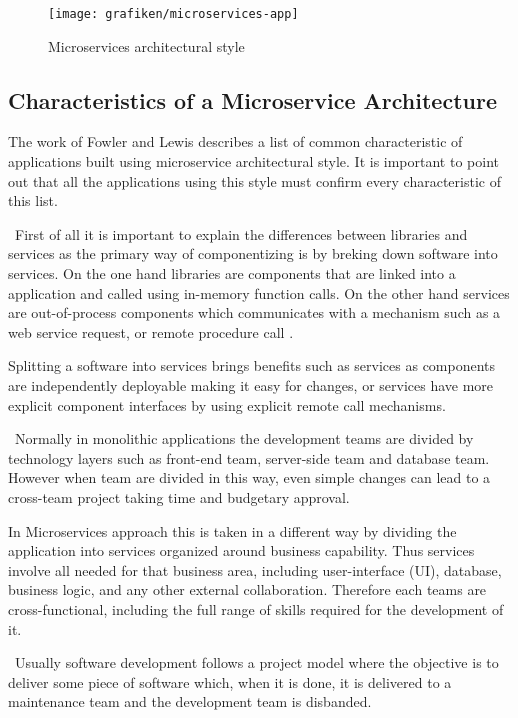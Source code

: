 \begin{figure}[H]
	\centering
    \texttt{[image: grafiken/microservices-app]}
    \caption{Microservices architectural style}
    \label{fig:microservices}
\end{figure}

\subsection*{Characteristics of a Microservice Architecture}
The work of Fowler and Lewis \cite{Fowler2014} describes a list of common characteristic of applications built using microservice architectural style. It is important to point out that all the applications using this style must confirm every characteristic of this list.

\begin{description}[style=nextline]
\item[Componentization via Services] \hfill \
First of all it is important to explain the differences between libraries and services as the primary way of componentizing is by breking down software into services. On the one hand libraries are components that are linked into a application and called using in-memory function calls. On the other hand services are out-of-process components which communicates with a mechanism such as a web service request, or remote procedure call \cite{Fowler2014}.

Splitting a software into services brings benefits such as services as components are independently deployable making it easy for changes, or services have more explicit component interfaces by using explicit remote call mechanisms. 
\item[Organized around Business Capabilities] \hfill \
Normally in monolithic applications the development teams are divided by technology layers such as front-end team, server-side team and database team. However when team are divided in this way, even simple changes can lead to a cross-team project taking time and budgetary approval.

In Microservices approach this is taken in a different way by dividing the application into services organized around business capability. Thus services involve all needed for that business area, including user-interface (UI), database, business logic, and any other external collaboration. Therefore each teams are cross-functional, including the full range of skills required for the development of it.
\item[Products not Projects] \hfill \
Usually software development follows a project model where the objective is to deliver some piece of software which, when it is done, it is delivered to a maintenance team and the development team is disbanded.


\end{description}

